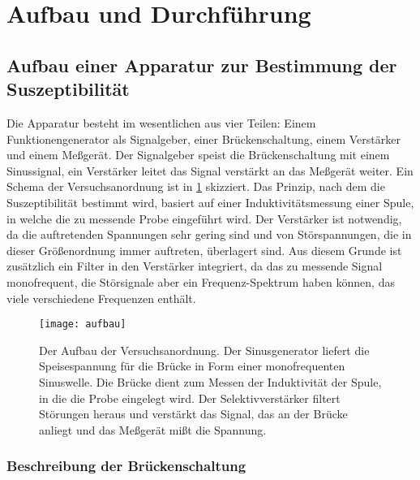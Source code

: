 
\section{Aufbau und Durchführung}

\subsection{Aufbau einer Apparatur zur Bestimmung der Suszeptibilität}
\label{sec:aufbau-apparatur}

Die Apparatur besteht im wesentlichen aus vier Teilen: Einem
Funktionengenerator als Signalgeber, einer Brückenschaltung, einem
Verstärker und einem Meßgerät.  Der Signalgeber speist die
Brückenschaltung mit einem Sinussignal, ein Verstärker leitet das Signal
verstärkt an das Meßgerät weiter.  Ein Schema der Versuchsanordnung ist
in \cref{fig:schema-aufbau} skizziert.  Das Prinzip, nach dem die
Suszeptibilität bestimmt wird, basiert auf einer Induktivitätsmessung
einer Spule, in welche die zu messende Probe eingeführt wird.  Der
Verstärker ist notwendig, da die auftretenden Spannungen sehr gering
sind und von Störspannungen, die in dieser Größenordnung immer
auftreten, überlagert sind.  Aus diesem Grunde ist zusätzlich ein Filter
in den Verstärker integriert, da das zu messende Signal monofrequent,
die Störsignale aber ein Frequenz-Spektrum haben können, das viele
verschiedene Frequenzen enthält.

\begin{figure}[b]
  \centering
  \texttt{[image: aufbau]}
  \caption{Der Aufbau der Versuchsanordnung.  Der Sinusgenerator liefert
    die Speisespannung für die Brücke in Form einer monofrequenten
    Sinuswelle.  Die Brücke dient zum Messen der Induktivität der Spule,
    in die die Probe eingelegt wird.  Der Selektivverstärker filtert
    Störungen heraus und verstärkt das Signal, das an der Brücke anliegt
    und das Meßgerät mißt die Spannung.}
  \label{fig:schema-aufbau}
\end{figure}

\subsubsection{Beschreibung der Brückenschaltung}

